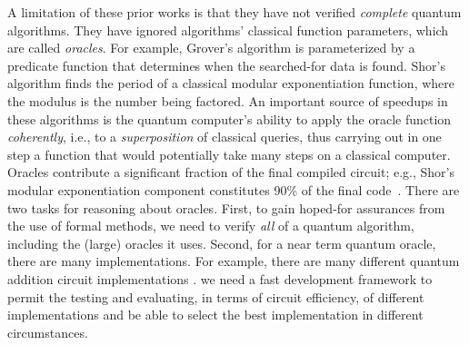 A limitation of these prior works is that they have not verified
\emph{complete} quantum algorithms. They have ignored algorithms'
classical function parameters, which are called \emph{oracles}. For
example, Grover's algorithm is parameterized by a predicate function that determines
when the searched-for data is found. Shor's algorithm finds the period
of a classical modular exponentiation function, where the modulus is
the number being factored.  An important source of speedups in these
algorithms is the quantum computer's ability to apply the oracle
function \emph{coherently}, i.e., to a \emph{superposition} of
classical queries, thus carrying out in one step a function that would
potentially take many steps on a classical computer.
%
Oracles contribute a significant fraction of the final compiled circuit; e.g., Shor's
modular exponentiation component constitutes 90\% of the final
code~\cite{Gidney2021howtofactorbit}. 
There are two tasks for reasoning about oracles. First,
to gain hoped-for assurances from the use of formal methods, we need
to verify \emph{all} of a quantum algorithm, including the (large) oracles it uses.
Second, for a near term quantum oracle, there are many implementations.
For example, there are many different quantum addition circuit implementations \cite{qft-adder,ripple-carry}. 
we need a fast development framework to permit the testing and evaluating,
in terms of circuit efficiency, of different implementations
and be able to select the best implementation in different circumstances. 


